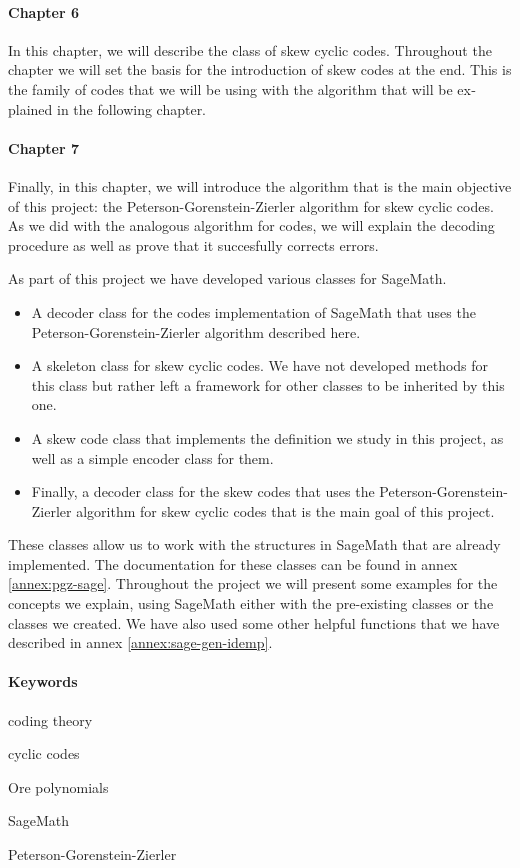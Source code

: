\begin{otherlanguage}{english}
\paragraph{Chapter 6} In this chapter, we will describe the class of skew cyclic codes.
Throughout the chapter we will set the basis for the introduction of skew  codes at the end.
This is the family of codes that we will be using with the algorithm that will be explained in the following chapter.

\paragraph{Chapter 7} Finally, in this chapter, we will introduce the algorithm that is the main objective of this project: the Peterson-Gorenstein-Zierler algorithm for skew cyclic codes.
As we did with the analogous algorithm for  codes, we will explain the decoding procedure as well as prove that it succesfully corrects errors.

As part of this project we have developed various classes for SageMath.
\begin{itemize}
  \item A decoder class for the  codes implementation of SageMath that uses the Peterson-Gorenstein-Zierler algorithm described here.
  \item A skeleton class for skew cyclic codes. We have not developed methods for this class but rather left a framework for other classes to be inherited by this one.
  \item A skew  code class that implements the definition we study in this project, as well as a simple encoder class for them.
  \item Finally, a decoder class for the skew  codes that uses the Peterson-Gorenstein-Zierler algorithm for skew cyclic codes that is the main goal of this project.
\end{itemize}

These classes allow us to work with the structures in SageMath that are already implemented.
The documentation for these classes can be found in annex \ref{annex:pgz-sage}.
Throughout the project we will present some examples for the concepts we explain, using SageMath either with the pre-existing classes or the classes we created.
We have also used some other helpful functions that we have described in annex \ref{annex:sage-gen-idemp}.

\paragraph{Keywords}
\begin{itemize*}[label=,itemsep=4em,itemjoin=\hspace{2em}]
  \item coding theory
  \item cyclic codes 
  \item Ore polynomials
  \item SageMath
  \item Peterson-Gorenstein-Zierler
\end{itemize*}

\end{otherlanguage}